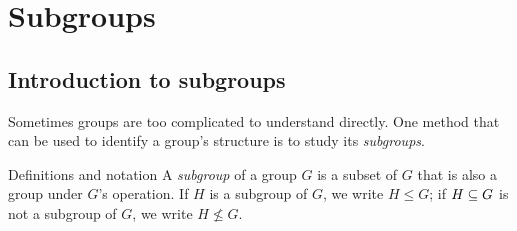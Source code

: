 \chapter{Subgroups}\label{subgps}

\section{Introduction to subgroups}

Sometimes groups are too complicated to understand directly.  One method that can be used to identify a group's structure is to study its \textit{subgroups}.

\begin{df}{Definitions and notation} A \textit{subgroup} of a group $G$ is a subset of $G$ that
is also a group under $G$'s operation. If $H$ is a subgroup of
$G$, we write $H \leq G$; if $H\subseteq G$ is not a subgroup of
$G$, we write $H\not\leq G$.\end{df}



